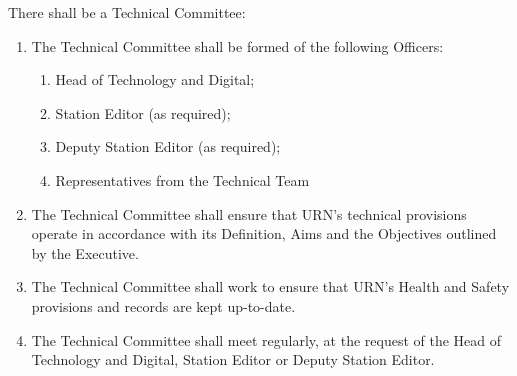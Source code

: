 \item There shall be a Technical Committee:
\begin{enumerate}[label*=\arabic*.]
    \item The Technical Committee shall be formed of the following Officers:
          \begin{enumerate}[label*=\arabic*.]
              \item Head of Technology and Digital;
              \item Station Editor (as required);
              \item Deputy Station Editor (as required);
              \item Representatives from the Technical Team
          \end{enumerate}
    \item The Technical Committee shall ensure that URN's technical provisions operate in accordance with its Definition, Aims and the Objectives outlined by the Executive.
    \item The Technical Committee shall work to ensure that URN's Health and Safety provisions and records are kept up-to-date.
    \item The Technical Committee shall meet regularly, at the request of the Head of Technology and Digital, Station Editor or Deputy Station Editor.
\end{enumerate}
